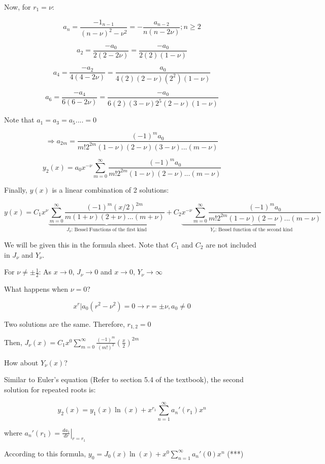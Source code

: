 Now, for $r_1 = \nu$:

$$a_n = \frac{-1_{n-1}}{(n - \nu)^2 - \nu^2} = -\frac{a_{n-2}}{n(n - 2 \nu)}; n \geq 2$$

$$a_2 = \frac{-a_0}{2(2-2\nu)} = \frac{-a_0}{2(2)(1-\nu)}$$

$$a_4 = \frac{-a_2}{4(4-2\nu)} = \frac{a_0}{4(2)(2-\nu)(2^2)(1 - \nu)}$$

$$a_6 = \frac{-a_4}{6(6 - 2 \nu)} = \frac{-a_0}{6(2)(3-\nu)2^5 (2 - \nu) (1 - \nu)}$$

Note that $a_1 = a_3 = a_5 .... = 0$

$$\Rightarrow a_{2m} = \frac{(-1)^m a_0}{m! 2^{2m} (1-\nu)(2 - \nu) (3 - \nu) ... (m - \nu)}$$

$$ y_2(x) = a_0 x^{-\nu} \sum_{m = 0}^\infty \frac{(-1)^m a_0}{m! 2^{2m} (1-\nu)(2 - \nu) ... (m - \nu)}$$

Finally, $y(x)$ is a linear combination of 2 solutions:

$$y(x) = C_1 x^{\nu} \underbrace{\sum_{m = 0}^\infty \frac{(-1)^m (x/2)^{2m}}{m (1 + \nu)(2 + \nu) ... (m + \nu)}}_{J_\nu \text{: Bessel Functions of the first kind}} + C_2 \underbrace{x^{-\nu} \sum_{m = 0}^\infty \frac{(-1)^m a_0}{m! 2^{2m} (1-\nu)(2 - \nu) ... (m - \nu)}}_{Y_\nu \text{: Bessel function of the second kind}}$$

We will be given this in the formula sheet. Note that $C_1$ and $C_2$ are not included in $J_\nu$ and $Y_\nu$.

For $\nu \neq \pm \frac{1}{2}$: As $x \to  0$, $J_\nu \to 0$ and $x \to  0$, $Y_\nu \to \infty$

What happens when $\nu = 0$?

$$x^r | a_0 (r^2 - \nu^2) = 0 \rightarrow r = \pm \nu, a_0 \neq 0$$

Two solutions are the same. Therefore, $r_{1,2} = 0$


Then, $J_\nu(x) = C_1 x^0 \sum_{m = 0}^\infty \frac{(-1)^m}{(m!)^2} \left(\frac{x}{2} \right)^{2m}$

How about $Y_\nu (x)$?

Similar to Euler's equation (Refer to section 5.4 of the textbook), the second solution for repeated roots is:

$$y_2 (x) = y_1(x) \ln(x) + x^{r_1} \sum_{n = 1}^\infty a_n ' (r_1) x^n$$

where $a_n ' (r_1) = \left. \frac{d a_1}{dr} \right|_{r = r_1}$

According to this formula, $y_0 = J_0 (x) \ln(x) + x^{0} \sum_{n = 1}^\infty a_n' (0) x^n$ (***)

